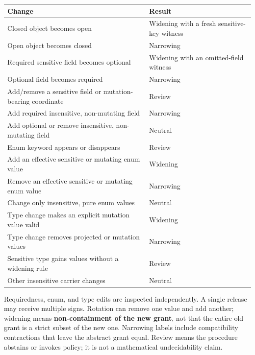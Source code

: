 {\def\LTcaptype{none} %
\begin{longtable}[]{@{}
  >{\raggedright\arraybackslash}p{}
  >{\raggedright\arraybackslash}p{}@{}}
\toprule\noalign{}
\begin{minipage}[b]{\linewidth}\raggedright
Change
\end{minipage} & \begin{minipage}[b]{\linewidth}\raggedright
Result
\end{minipage} \\
\midrule\noalign{}
\endhead
\bottomrule\noalign{}
\endlastfoot
Closed object becomes open & Widening with a fresh sensitive-key witness \\
Open object becomes closed & Narrowing \\
Required sensitive field becomes optional & Widening with an omitted-field witness \\
Optional field becomes required & Narrowing \\
Add/remove a sensitive field or mutation-bearing coordinate & Review \\
Add required insensitive, non-mutating field & Narrowing \\
Add optional or remove insensitive, non-mutating field & Neutral \\
Enum keyword appears or disappears & Review \\
Add an effective sensitive or mutating enum value & Widening \\
Remove an effective sensitive or mutating enum value & Narrowing \\
Change only insensitive, pure enum values & Neutral \\
Type change makes an explicit mutation value valid & Widening \\
Type change removes projected or mutation values & Narrowing \\
Sensitive type gains values without a widening rule & Review \\
Other insensitive carrier changes & Neutral \\
\end{longtable}
}

Requiredness, enum, and type edits are inspected independently. A single release may receive multiple signs. Rotation can remove one value and add another; widening means \textbf{non-containment of the new grant}, not that the entire old grant is a strict subset of the new one. Narrowing labels include compatibility contractions that leave the abstract grant equal. Review means the procedure abstains or invokes policy; it is not a mathematical undecidability claim.

